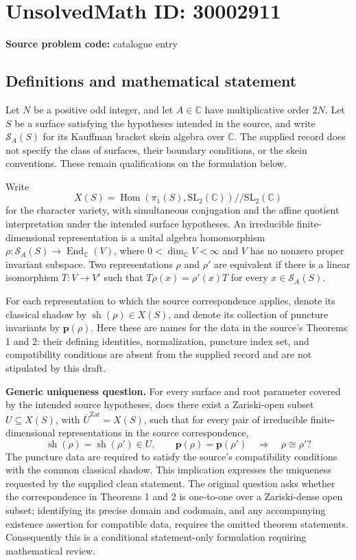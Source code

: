 \documentclass[11pt]{article}
\newcommand{\C}{\mathbb{C}}
\begin{document}
\section*{UnsolvedMath ID: 30002911}
\textbf{Source problem code:} catalogue entry
\subsection{Definitions and mathematical statement}
Let \(N\) be a positive odd integer, and let \(A\in\C\) have multiplicative order \(2N\). Let \(S\) be a surface satisfying the hypotheses intended in the source, and write \(\mathcal S_A(S)\) for its Kauffman bracket skein algebra over \(\C\). The supplied record does not specify the class of surfaces, their boundary conditions, or the skein conventions. These remain qualifications on the formulation below.

Write
\[
X(S)=\operatorname{Hom}(\pi_1(S),\mathrm{SL}_2(\C))\mathbin{/\!/}\mathrm{SL}_2(\C)
\]
for the character variety, with simultaneous conjugation and the affine quotient interpretation under the intended surface hypotheses. An irreducible finite-dimensional representation is a unital algebra homomorphism \(\rho:\mathcal S_A(S)\to\operatorname{End}_{\C}(V)\), where \(0<\dim_{\C}V<\infty\) and \(V\) has no nonzero proper invariant subspace. Two representations \(\rho\) and \(\rho'\) are equivalent if there is a linear isomorphism \(T:V\to V'\) such that \(T\rho(x)=\rho'(x)T\) for every \(x\in\mathcal S_A(S)\).

For each representation to which the source correspondence applies, denote its classical shadow by \(\operatorname{sh}(\rho)\in X(S)\), and denote its collection of puncture invariants by \(\mathbf p(\rho)\). Here these are names for the data in the source's Theorems 1 and 2: their defining identities, normalization, puncture index set, and compatibility conditions are absent from the supplied record and are not stipulated by this draft.

\textbf{Generic uniqueness question.} For every surface and root parameter covered by the intended source hypotheses, does there exist a Zariski-open subset \(U\subseteq X(S)\), with \(\overline U^{\mathrm{Zar}}=X(S)\), such that for every pair of irreducible finite-dimensional representations in the source correspondence,
\[
\operatorname{sh}(\rho)=\operatorname{sh}(\rho')\in U,
\qquad
\mathbf p(\rho)=\mathbf p(\rho')
\quad\Longrightarrow\quad
\rho\cong\rho'?
\]
The puncture data are required to satisfy the source's compatibility conditions with the common classical shadow. This implication expresses the uniqueness requested by the supplied clean statement. The original question asks whether the correspondence in Theorems 1 and 2 is one-to-one over a Zariski-dense open subset; identifying its precise domain and codomain, and any accompanying existence assertion for compatible data, requires the omitted theorem statements. Consequently this is a conditional statement-only formulation requiring mathematical review.
\end{document}
